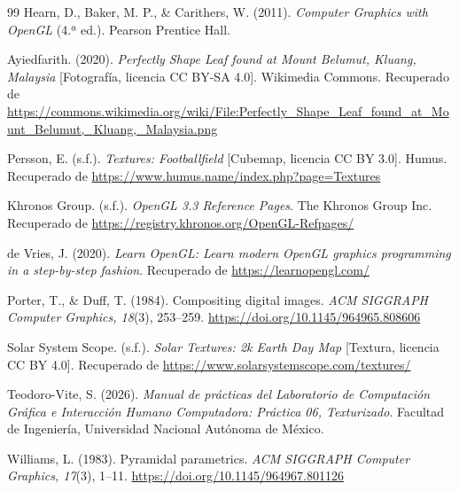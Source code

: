 \begin{thebibliography}{99}
Hearn, D., Baker, M. P., \& Carithers, W. (2011). \textit{Computer Graphics with OpenGL} (4.ª ed.). Pearson Prentice Hall.

Ayiedfarith. (2020). \textit{Perfectly Shape Leaf found at Mount Belumut, Kluang, Malaysia} [Fotografía, licencia CC BY-SA 4.0]. Wikimedia Commons. Recuperado de \url{https://commons.wikimedia.org/wiki/File:Perfectly_Shape_Leaf_found_at_Mount_Belumut,_Kluang,_Malaysia.png}

Persson, E. (s.f.). \textit{Textures: Footballfield} [Cubemap, licencia CC BY 3.0]. Humus. Recuperado de \url{https://www.humus.name/index.php?page=Textures}

Khronos Group. (s.f.). \textit{OpenGL 3.3 Reference Pages}. The Khronos Group Inc. Recuperado de \url{https://registry.khronos.org/OpenGL-Refpages/}

de Vries, J. (2020). \textit{Learn OpenGL: Learn modern OpenGL graphics programming in a step-by-step fashion}. Recuperado de \url{https://learnopengl.com/}

Porter, T., \& Duff, T. (1984). Compositing digital images. \textit{ACM SIGGRAPH Computer Graphics, 18}(3), 253--259. \url{https://doi.org/10.1145/964965.808606}

Solar System Scope. (s.f.). \textit{Solar Textures: 2k Earth Day Map} [Textura, licencia CC BY 4.0]. Recuperado de \url{https://www.solarsystemscope.com/textures/}

Teodoro-Vite, S. (2026). \textit{Manual de prácticas del Laboratorio de Computación Gráfica e Interacción Humano Computadora: Práctica 06, Texturizado}. Facultad de Ingeniería, Universidad Nacional Autónoma de México.

Williams, L. (1983). Pyramidal parametrics. \textit{ACM SIGGRAPH Computer Graphics, 17}(3), 1--11. \url{https://doi.org/10.1145/964967.801126}

\end{thebibliography}
